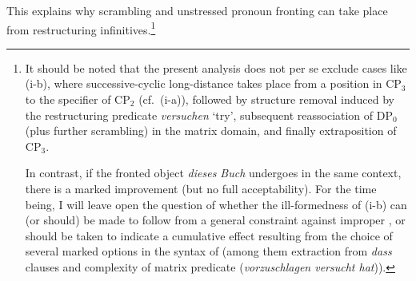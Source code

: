 \documentclass[output=paper]{langsci/langscibook}
\begin{document}
This explains why scrambling and unstressed pronoun fronting can take place
from restructuring infinitives.\footnote{It should be noted that the present
    analysis does not per se exclude cases like (i-b), where successive-cyclic
    long-distance  takes place from a position in CP$_3$ to the
    specifier of CP$_2$ (cf.\ (i-a)), followed by structure removal induced by
    the restructuring predicate {\it versuchen} \enquote*{try}, subsequent
    reassociation of DP$_0$ (plus further scrambling) in the matrix domain, and
    finally extraposition of CP$_3$.

\begin{exe}
\begin{xlist}
\end{xlist}
\end{exe}

In contrast, if the fronted object {\it dieses Buch} undergoes
in the same context, there is a marked improvement (but no full
acceptability). For the time being, I will leave open the question of whether
the ill-formedness of (i-b) can (or should) be made to follow from a general
constraint against improper , or should be taken to indicate a
cumulative effect resulting from the choice of several marked options in the
syntax of  (among them extraction from {\it dass} clauses and complexity
of matrix predicate ({\it vorzuschlagen versucht hat})).}
\end{document}
